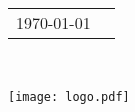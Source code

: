 \begin{titlepage}
\setcounter{footnote}{0}




{ \large
\begin{tabular}{rc}
\today
\end{tabular}\\[1cm]
}


\texttt{[image: logo.pdf]} %
 

\vfill %

\end{titlepage}
\restoregeometry


\setcounter{page}{2}%


\begin{abstract}

\end{abstract}

\begin{otherlanguage}{english}
\begin{abstract}

\end{abstract}
\end{otherlanguage}

\clearpage
\renewcommand{\contentsname}{Innehållsförteckning}
\tableofcontents

\clearpage
{}
\setcounter{page}{1}

\renewcommand{\thefootnote}{\arabic{footnote}}
\setcounter{footnote}{0}
